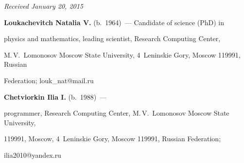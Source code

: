 {{


} }








\vspace*{-4pt}





\hfill{\small\textit{Received January 20, 2015}}





\vspace*{-11pt}





\Contr





\vspace*{-4pt}





\noindent


\textbf{Loukachevitch Natalia V.} (b.\ 1964)~--- Candidate of science (PhD) in


physics and mathematics, leading scientist, Research Computing Center,


M.\,V.~Lomonosov Moscow State University, 4~Leninskie Gory,  Moscow 119991, Russian


Federation; louk\_nat@mail.ru





\vspace*{1pt}





\noindent


\textbf{Chetviorkin Ilia I.} (b.\ 1988)~---


programmer, Research Computing Center, M.\,V.~Lomonosov Moscow State University,


119991, Moscow, 4~Leninskie Gory, Moscow 119991, Russian Federation;


ilia2010@yandex.ru





 \label{end\stat}








\renewcommand{\bibname}{\protect\rm Литература}








